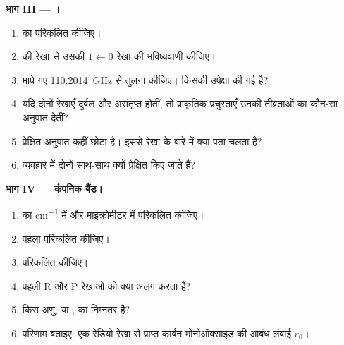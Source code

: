 \begin{problem}
\medskip\noindent\textbf{भाग III --- ।}
\begin{enumerate}[resume]
  \item {} का  परिकलित कीजिए।
  \item {} की रेखा से उसकी $1 \leftarrow 0$ रेखा की भविष्यवाणी कीजिए।
  \item मापे गए \qty{110.2014}{GHz} से तुलना कीजिए। किसकी उपेक्षा की गई है?
  \item यदि दोनों रेखाएँ दुर्बल और असंतृप्त होतीं, तो प्राकृतिक प्रचुरताएँ उनकी
        तीव्रताओं का कौन-सा अनुपात देतीं?
  \item प्रेक्षित अनुपात कहीं छोटा है। इससे
         रेखा के बारे में क्या पता चलता है?
  \item व्यवहार में दोनों  साथ-साथ क्यों प्रेक्षित किए जाते हैं?
\end{enumerate}

\medskip\noindent\textbf{भाग IV --- कंपनिक बैंड।}
\begin{enumerate}[resume]
  \item {} का  \unit{cm^{-1}} में और
        माइक्रोमीटर में परिकलित कीजिए।
  \item पहला  परिकलित कीजिए।
  \item {} परिकलित कीजिए।
  \item पहली R और P रेखाओं को क्या अलग करता है?
  \item किस अणु,  या , का  निम्नतर है?
  \item परिणाम बताइए: एक रेडियो रेखा से प्राप्त कार्बन मोनोऑक्साइड की
        आबंध लंबाई $r_0$।
\end{enumerate}
\end{problem}

